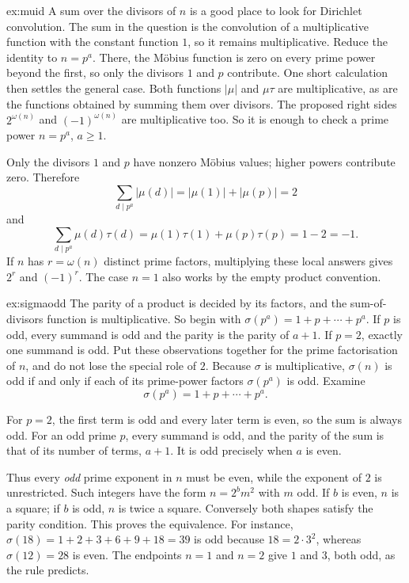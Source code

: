 \begin{solution}{ex:muid}
\idea A sum over the divisors of $n$ is a good place to look for Dirichlet convolution. The sum in the question is the convolution of a multiplicative function with the constant function $1$, so it remains multiplicative. Reduce the identity to $n=p^a$. There, the Möbius function is zero on every prime power beyond the first, so only the divisors $1$ and $p$ contribute. One short calculation then settles the general case.
\writeup Both functions $|\mu|$ and $\mu\tau$ are multiplicative, as are the functions obtained by summing them over divisors. The proposed right sides $2^{\omega(n)}$ and $(-1)^{\omega(n)}$ are multiplicative too. So it is enough to check a prime power $n=p^a$, $a\ge1$.

Only the divisors $1$ and $p$ have nonzero M\"obius values; higher powers contribute zero. Therefore
\[
\sum_{d\mid p^a}|\mu(d)|=|\mu(1)|+|\mu(p)|=2
\]
and
\[
\sum_{d\mid p^a}\mu(d)\tau(d)
=\mu(1)\tau(1)+\mu(p)\tau(p)=1-2=-1.
\]
If $n$ has $r=\omega(n)$ distinct prime factors, multiplying these local answers gives $2^r$ and $(-1)^r$. The case $n=1$ also works by the empty product convention.
\end{solution}

\begin{solution}{ex:sigmaodd}
\idea The parity of a product is decided by its factors, and the sum-of-divisors function is multiplicative. So begin with $\sigma(p^a)=1+p+\cdots+p^a$. If $p$ is odd, every summand is odd and the parity is the parity of $a+1$. If $p=2$, exactly one summand is odd. Put these observations together for the prime factorisation of $n$, and do not lose the special role of $2$.
\writeup Because $\sigma$ is multiplicative, $\sigma(n)$ is odd if and only if each of its prime-power factors $\sigma(p^a)$ is odd. Examine
\[
\sigma(p^a)=1+p+\cdots+p^a.
\]

For $p=2$, the first term is odd and every later term is even, so the sum is always odd. For an odd prime $p$, every summand is odd, and the parity of the sum is that of its number of terms, $a+1$. It is odd precisely when $a$ is even.

Thus every \emph{odd} prime exponent in $n$ must be even, while the exponent of $2$ is unrestricted. Such integers have the form $n=2^bm^2$ with $m$ odd. If $b$ is even, $n$ is a square; if $b$ is odd, $n$ is twice a square. Conversely both shapes satisfy the parity condition. This proves the equivalence.
For instance, $\sigma(18)=1+2+3+6+9+18=39$ is odd because
$18=2\cdot3^2$, whereas $\sigma(12)=28$ is even. The endpoints
$n=1$ and $n=2$ give $1$ and $3$, both odd, as the rule predicts.
\end{solution}

